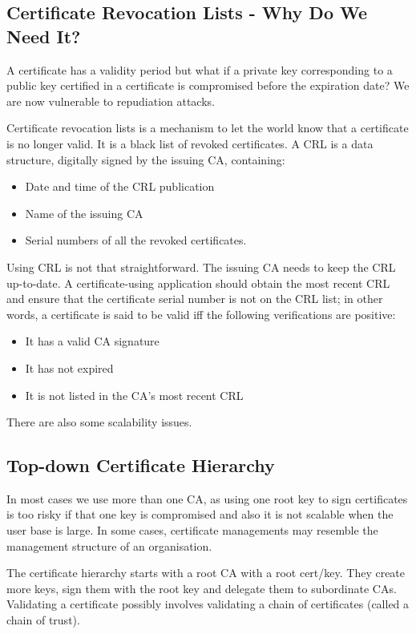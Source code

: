 \documentclass{article}
\begin{document}
\subsection{Certificate Revocation Lists - Why Do We Need It?}
A certificate has a validity period but what if a private key corresponding to a public key certified in a certificate is compromised before the expiration date? We are now vulnerable to repudiation attacks.

Certificate revocation lists is a mechanism to let the world know that a certificate is no longer valid. It is a black list of revoked certificates. A CRL is a data structure, digitally signed by the issuing CA, containing:
\begin{itemize}
  \item Date and time of the CRL publication
  \item Name of the issuing CA
  \item Serial numbers of all the revoked certificates.
\end{itemize}
Using CRL is not that straightforward. The issuing CA needs to keep the CRL up-to-date. A certificate-using application should obtain the most recent CRL and ensure that the certificate serial number is not on the CRL list; in other words, a certificate is said to be valid iff the following verifications are positive:
\begin{itemize}
  \item It has a valid CA signature
  \item It has not expired
  \item It is not listed in the CA's most recent CRL
\end{itemize}
There are also some scalability issues.

\subsection{Top-down Certificate Hierarchy}
In most cases we use more than one CA, as using one root key to sign certificates is too risky if that one key is compromised and also it is not scalable when the user base is large. In some cases, certificate managements may resemble the management structure of an organisation.

The certificate hierarchy starts with a root CA with a root cert/key. They create more keys, sign them with the root key and delegate them to subordinate CAs. Validating a certificate possibly involves validating a chain of certificates (called a chain of trust).
\end{document}

